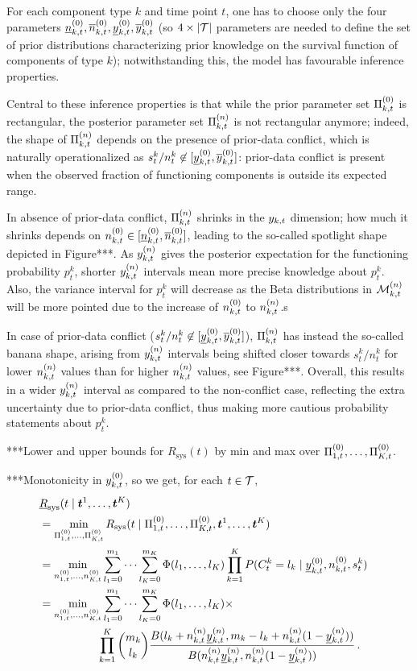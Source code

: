 \documentclass[authoryear, 12pt, a4paper]{elsarticle}
\renewcommand{\vec}[1]{{\bm#1}}
\newcommand{\ul}[1]{\underline{#1}}
\newcommand{\Rsys}{R_\text{sys}}
\newcommand{\lRsys}{\ul{R}_\text{sys}}
\begin{document}
For each component type $k$ and time point $t$,
one has to choose only the four parameters $\nktzl, \nktzu, \yktzl, \yktzu$
(so $4 \times |{\cal T}|$ parameters are needed to define the set of prior distributions characterizing
prior knowledge on the survival function of components of type $k$);
notwithstanding this, the model has favourable inference properties.

Central to these inference properties is that
while the prior parameter set $\Pi^{(0)}_{k,t}$ is rectangular,
the posterior parameter set $\Pi^{(n)}_{k,t}$ is not rectangular anymore;
indeed, the shape of $\Pi^{(n)}_{k,t}$ depends on the presence of prior-data conflict,
which is naturally operationalized as $s^k_t/n^k_t \not\in [\yktzl, \yktzu]$:
prior-data conflict is present when the observed fraction of functioning components
is outside its expected range.

In absence of prior-data conflict, 
$\Pi^{(n)}_{k,t}$ shrinks in the $y_{k,t}$ dimension;
how much it shrinks depends on $\nktz \in [\nktzl, \nktzu]$,
leading to the so-called spotlight shape depicted in Figure***.
As $y^{(n)}_{k,t}$ gives the posterior expectation for the functioning probability $p_t^k$,
shorter $y^{(n)}_{k,t}$ intervals mean more precise knowledge about $p_t^k$.
Also, the variance interval for $p_t^k$ will decrease
as the Beta distributions in $\mathcal{M}^{(n)}_{k,t}$ will be more pointed
due to the increase of $n^{(0)}_{k,t}$ to $n^{(n)}_{k,t}$.s

In case of prior-data conflict ($s^k_t/n^k_t \not\in [\yktzl, \yktzu]$),
$\Pi^{(n)}_{k,t}$ has instead the so-called banana shape,
arising from $y^{(n)}_{k,t}$ intervals being shifted closer towards $s^k_t/n^k_t$
for lower $n^{(n)}_{k,t}$ values than for higher $n^{(n)}_{k,t}$ values, see Figure***.
Overall, this results in a wider $y^{(n)}_{k,t}$ interval as compared to the non-conflict case, 
reflecting the extra uncertainty due to prior-data conflict,
thus making more cautious probability statements about $p_t^k$.

***Lower and upper bounds for $\Rsys(t)$ by min and max over $\Pi^{(0)}_{1,t}, \ldots, \Pi^{(0)}_{K,t}$.

***Monotonicity in $y^{(0)}_{k,t}$, so we get, for each $t \in {\cal T}$,
\begin{align*}
\lefteqn{\lRsys(t \mid \vec{t}^1, \ldots, \vec{t}^K)}\\
 &= \min_{\PtZi{1}, \ldots, \PtZi{K}} \Rsys(t \mid \PtZi{1}, \ldots, \PtZi{K}, \vec{t}^1, \ldots, \vec{t}^K) \\
 &= \min_{\nz_{1,t},\ldots,\nz_{K,t}} 
    \sum_{l_1=0}^{m_1} \cdots \sum_{l_K=0}^{m_K} \Phi(l_1, \ldots, l_K)
                                                 \prod_{k=1}^K P(C^k_t = l_k \mid \yktzl, \nktz, s^k_t) \\
 &= \min_{\nz_{1,t},\ldots,\nz_{K,t}} 
    \sum_{l_1=0}^{m_1} \cdots \sum_{l_K=0}^{m_K} \Phi(l_1, \ldots, l_K) \times \\ & \hspace*{12ex}
    \prod_{k=1}^K {m_k \choose l_k} \frac{B(l_k + \nn_{k,t}\ynl_{k,t}, m_k - l_k + \nn_{k,t}(1-\ynl_{k,t}))}
                                         {B(\nn_{k,t}\ynl_{k,t}, \nn_{k,t}(1-\ynl_{k,t}))} \,.
\end{align*}
\end{document}
